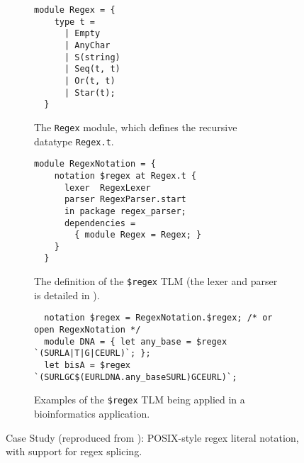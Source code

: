 \documentclass[acmsmall,review]{acmart}
\newcommand{\li}[1]{\lstinline[basicstyle=\ttfamily\fontsize{9pt}{1em}\selectfont]{#1}}
\theoremstyle{slplain}
\numberwithin{thm}{section}
\begin{document}
\begin{figure}[t]
\begin{subfigure}[t]{0.45\textwidth}
\vspace{-1px}
\begin{lstlisting}[mathescape=~]
  module Regex = {
    type t = 
      | Empty
      | AnyChar 
      | S(string)
      | Seq(t, t) 
      | Or(t, t) 
      | Star(t);
  }
\end{lstlisting}
\vspace{-5px}
\caption{The \li{Regex} module, which defines the recursive datatype \li{Regex.t}.}
\label{fig:Regex-module-def}
\end{subfigure}
\hfill
\begin{subfigure}[t]{0.53\textwidth}
\vspace{-1px}
\begin{lstlisting}[mathescape=|]
  module RegexNotation = {
    notation $regex at Regex.t {
      lexer  RegexLexer  
      parser RegexParser.start
      in package regex_parser;
      dependencies = 
        { module Regex = Regex; }
    }
  }
\end{lstlisting}
\vspace{-5px}
\caption{The definition of the \li{$regex} TLM (the lexer and parser is detailed in \cite{TLMs-paper}).}
\label{fig:regex-tlm-def}
\end{subfigure}

\begin{subfigure}[t]{\textwidth}
\vspace{5px}
\begin{lstlisting}
  notation $regex = RegexNotation.$regex; /* or open RegexNotation */
  module DNA = { let any_base = $regex `(SURLA|T|G|CEURL)`; };
  let bisA = $regex `(SURLGC$(EURLDNA.any_baseSURL)GCEURL)`;
\end{lstlisting}
\vspace{-4px}
\caption{Examples of the \li{$regex} TLM being applied in a bioinformatics application. %
}
\label{fig:first-tlm-example}
\end{subfigure}
\vspace{3px}
\caption{Case Study (reproduced from \cite{TLMs-paper}): POSIX-style regex literal notation, with support for regex splicing.}
\vspace{-4px}
\label{fig:regex-case-study}
\end{figure}
\end{document}
